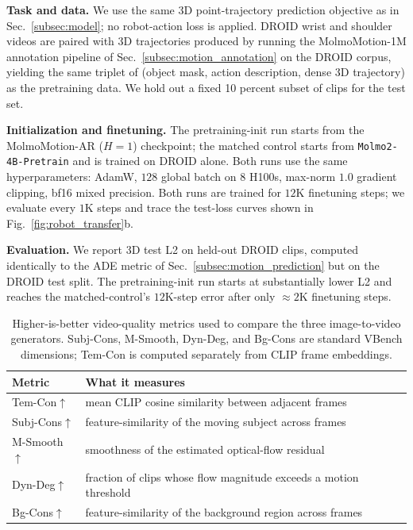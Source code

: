 \noindent\textbf{Task and data.}
We use the same 3D point-trajectory prediction objective as in
Sec.~\ref{subsec:model}; no robot-action loss is applied. DROID wrist and
shoulder videos are paired with 3D trajectories produced by running the
MolmoMotion-1M annotation pipeline of Sec.~\ref{subsec:motion_annotation} on
the DROID corpus, yielding the same triplet of (object mask, action
description, dense 3D trajectory) as the pretraining data. We hold out a fixed 10 percent subset of clips for the test set.

\noindent\textbf{Initialization and finetuning.}
The pretraining-init run starts from the MolmoMotion-AR ($H=1$) checkpoint; the matched control starts
from \texttt{Molmo2-4B-Pretrain} and is trained on DROID alone. Both runs use
the same hyperparameters:
AdamW, $128$ global batch on $8$ H100s, max-norm $1.0$ gradient clipping,
bf16 mixed precision. Both runs are trained for $12$K finetuning steps; we
evaluate every $1$K steps and trace the test-loss curves shown in
Fig.~\ref{fig:robot_transfer}b.

\noindent\textbf{Evaluation.}
We report 3D test L2 on held-out DROID clips, computed identically to the
ADE metric of Sec.~\ref{subsec:motion_prediction} but on the DROID test
split. The pretraining-init run starts at substantially lower L2 and reaches
the matched-control's $12$K-step error after only $\approx 2$K finetuning
steps.



\begin{table}[t]
  \centering
  \small
  \setlength{\tabcolsep}{6pt}
  \begin{tabular}{ll}
    Metric              & What it measures \\
    \midrule
    Tem-Con$\uparrow$   & mean CLIP cosine similarity between adjacent frames \\
    Subj-Cons$\uparrow$ & feature-similarity of the moving subject across frames \\
    M-Smooth$\uparrow$  & smoothness of the estimated optical-flow residual \\
    Dyn-Deg$\uparrow$   & fraction of clips whose flow magnitude exceeds a motion threshold \\
    Bg-Cons$\uparrow$   & feature-similarity of the background region across frames \\
  \end{tabular}
  \vspace{2mm}
  \caption{Higher-is-better video-quality metrics used to compare the three image-to-video generators. Subj-Cons, M-Smooth, Dyn-Deg, and Bg-Cons are standard VBench dimensions; Tem-Con is computed separately from CLIP frame embeddings.}
  \label{tab:vidgen-metrics}
\end{table}




